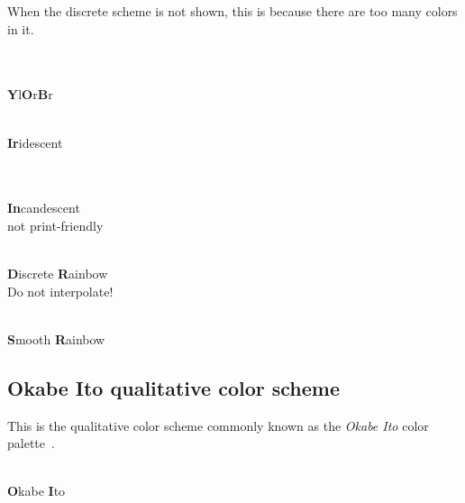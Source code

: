 \documentclass{scrartcl}
\begin{document}
When the discrete scheme is not shown, this is because there are too many colors in it.

\begin{center}
	\\
	\\
	\textbf{Y}l\textbf{O}r\textbf{B}r
\end{center}

\begin{center}
	\\
	\textbf{Ir}idescent
\end{center}

\begin{center}
	\\
	\\
	\textbf{In}candescent\\
	not print-friendly
\end{center}

\begin{center}
	\\
	\textbf{D}iscrete \textbf{R}ainbow\\
	Do not interpolate!
\end{center}

\begin{center}
	\\
	\textbf{S}mooth \textbf{R}ainbow\\
\end{center}\clearpage

\subsection{Okabe Ito qualitative color scheme}\label{sec:OkabeIto}
This is the qualitative color scheme commonly known as the \emph{Okabe Ito} color palette~\cite{Okabe_2002}.

\begin{center}
	\\
	\textbf{O}kabe \textbf{I}to
\end{center}
\end{document}
